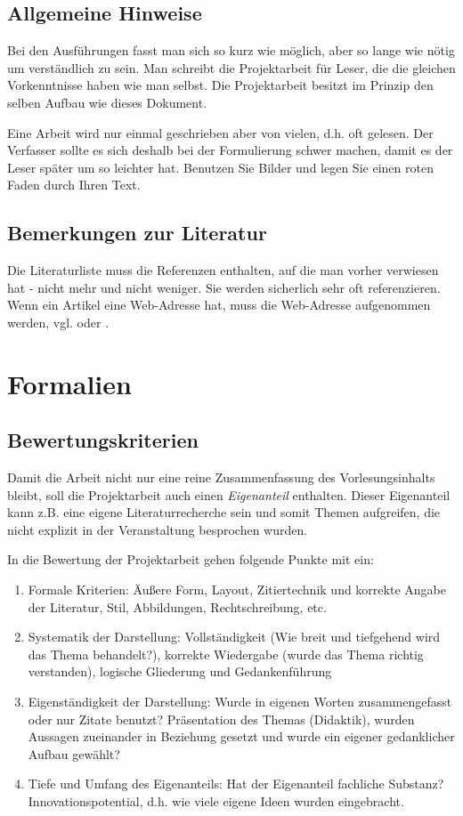 \documentclass[fleqn,10pt,ngerman]{SelfArx}
\begin{document}
\subsection{Allgemeine Hinweise}
Bei den Ausführungen fasst man sich so kurz wie möglich, aber so lange wie nötig um verständlich zu sein. Man schreibt die Projektarbeit für Leser, die die gleichen Vorkenntnisse haben wie man selbst.
Die Projektarbeit besitzt im Prinzip den selben Aufbau wie dieses Dokument.

Eine Arbeit wird nur einmal geschrieben aber von vielen, d.h. oft gelesen. Der Verfasser sollte es sich deshalb bei der Formulierung schwer machen, damit es der Leser später um so leichter hat. Benutzen Sie Bilder und legen Sie einen roten Faden durch Ihren Text.

\subsection{Bemerkungen zur Literatur}
Die Literaturliste muss die Referenzen enthalten, auf die man vorher verwiesen hat - nicht mehr und nicht weniger. Sie werden sicherlich sehr oft referenzieren. Wenn ein Artikel eine Web-Adresse hat, muss die Web-Adresse aufgenommen werden, vgl. \cite{RobertMartinOOMetrics} oder \cite{RobertMartinSOLID}.






\section{Formalien}
\subsection{Bewertungskriterien}
Damit die Arbeit nicht nur eine reine Zusammenfassung des Vorlesungsinhalts bleibt, soll die Projektarbeit auch einen {\it Eigenanteil} enthalten. Dieser Eigenanteil kann z.B. eine eigene Literaturrecherche sein und somit Themen aufgreifen, die nicht explizit in der Veranstaltung besprochen wurden.


In die Bewertung der Projektarbeit gehen folgende Punkte mit ein:
\begin{enumerate}[noitemsep]
\item Formale Kriterien: Äußere Form, Layout, Zitiertechnik und korrekte Angabe der Literatur, Stil, Abbildungen, Rechtschreibung, etc.
\item Systematik der Darstellung: Vollständigkeit (Wie breit und tiefgehend wird das Thema behandelt?), korrekte Wiedergabe (wurde das Thema richtig verstanden), logische Gliederung und Gedankenführung
\item Eigenständigkeit der Darstellung: Wurde in eigenen Worten zusammengefasst oder nur Zitate benutzt? Präsen\-tation des Themas (Didaktik), wurden Aussagen zueinander in Beziehung gesetzt und wurde ein eigener gedanklicher Aufbau gewählt?
\item Tiefe und Umfang des Eigenanteils: Hat der Eigenanteil fachliche Substanz? Innovationspotential, d.h. wie viele eigene Ideen wurden eingebracht.
\end{enumerate}
\end{document}
